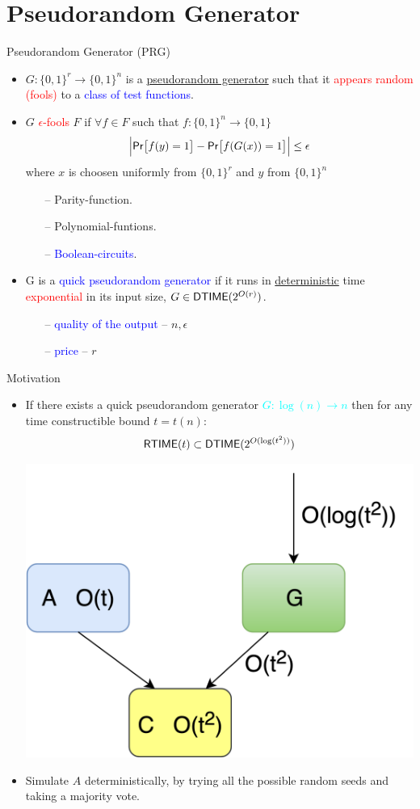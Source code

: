 \documentclass[xcolor={table,dvipsnames,usenames}]{beamer}
\begin{document}
\section{Pseudorandom Generator}
\begin{frame}{Pseudorandom Generator (PRG)}
\begin{itemize}
	\pause
	\item $G: \{0,1\}^r \rightarrow \{0,1\}^n$ is a {\underline{pseudorandom generator}} such that it \textcolor{red}{appears random (fools)} to a \textcolor{blue}{class of test functions}.
	\pause
	\item $G$ \textcolor{red}{$\epsilon$-fools} $F$ if $\forall f \in F$ such that $f: \{0,1\}^n \rightarrow \{0,1\}$
	$$\Big|\mathsf{Pr}\big[f(y) = 1\big] -  \mathsf{Pr}\big[f(G(x)) = 1 \big]\Big| \leq \epsilon$$
	where $x$ is choosen uniformly from $\{0,1\}^r$ and $y$ from $\{0,1\}^n$
	\pause
	\begin{itemize}
		\item[--] Parity-function.
		\item[--] Polynomial-funtions.
		\item[--] \textcolor{blue}{Boolean-circuits}.
	\end{itemize}
	\pause
	\item G is a \textcolor{blue}{quick pseudorandom generator} if it runs in \underline{deterministic} time \textcolor{red}{exponential} in its input size, $G \in \mathsf{DTIME} (2^{O(r)})$.
	\pause 
	\begin{itemize}
		\item[--] \textcolor{blue}{quality of the output} -- $n,\epsilon$
		\item[--] \textcolor{blue}{price} -- $r$
	\end{itemize}
\end{itemize}
\end{frame}
\begin{frame}{Motivation}
\begin{itemize}
	\pause
	\item If there exists a quick pseudorandom generator \textcolor{cyan}{$G: \log(n) \rightarrow n$} then for any time constructible bound $t=t(n):$ 
	\textcolor{red}{$$\mathsf{RTIME}(t) \subset \mathsf{DTIME}(2^{O(\log(t^2))})$$}
	\pause
	\begin{center}
			        \includegraphics[width=0.4\columnwidth]{figures/RandomSimulation}
	\end{center}
\pause
\item  Simulate $A$ deterministically, by trying all the possible random seeds and taking a majority vote. 
\end{itemize}
\end{frame}
\end{document}
